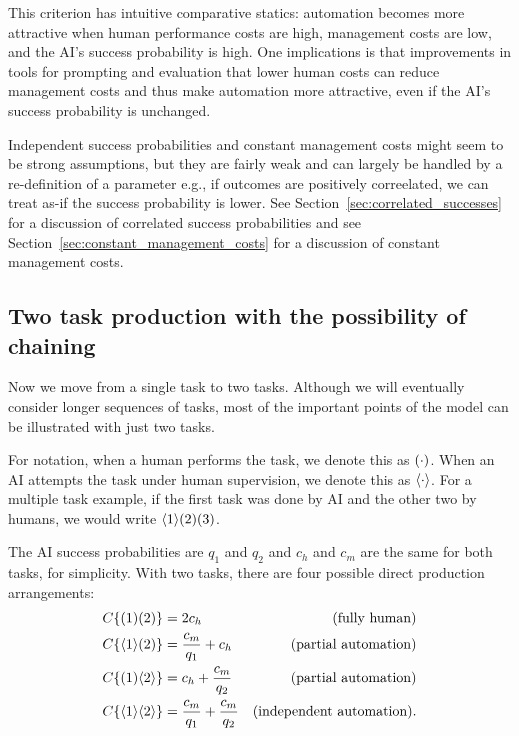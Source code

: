 \documentclass{article}
\begin{document}
This criterion has intuitive comparative statics: automation becomes more attractive when human performance costs are high, management costs are low, and the AI's success probability is high.
One implications is that improvements in tools for prompting and evaluation that lower human costs can reduce management costs and thus make automation more attractive, even if the AI's success probability is unchanged.

Independent success probabilities and constant management costs might seem to be strong assumptions, but they are fairly weak and can largely be handled by a re-definition of a parameter e.g., if outcomes are positively correelated, we can treat as-if the success probability is lower. 
See Section~\ref{sec:correlated_successes} for a discussion of correlated success probabilities and see Section~\ref{sec:constant_management_costs} for a discussion of constant management costs.

\subsection{Two task production with the possibility of chaining}
Now we move from a single task to two tasks.  
Although we will eventually consider longer sequences of tasks, most of the important points of the model can be illustrated with just two tasks.

For notation, when a human performs the task, we denote this as $( \cdot )$.
When an AI attempts the task under human supervision, we denote this as $\langle \cdot \rangle$.
For a multiple task example, if the first task was done by AI and the other two by humans, we would write $\langle 1 \rangle( 2 )( 3 )$.

The AI success probabilities are $q_1$ and $q_2$ and $c_h$ and $c_m$ are the same for both tasks, for simplicity.
With two tasks, there are four possible direct production arrangements:
\begin{align*}
    C\{ ( 1 )( 2 ) \} &= 2c_h & \text{(fully human)} \\
    C\{ \langle 1 \rangle( 2 ) \} &= \frac{c_m}{q_1} + c_h & \text{(partial automation)} \\
    C\{ ( 1 )\langle 2 \rangle \} &= c_h + \frac{c_m}{q_2} & \text{(partial automation)} \\
    C\{ \langle 1 \rangle\langle 2 \rangle \} &= \frac{c_m}{q_1} + \frac{c_m}{q_2} & \text{(independent automation)}. \\
\end{align*}
\end{document}
